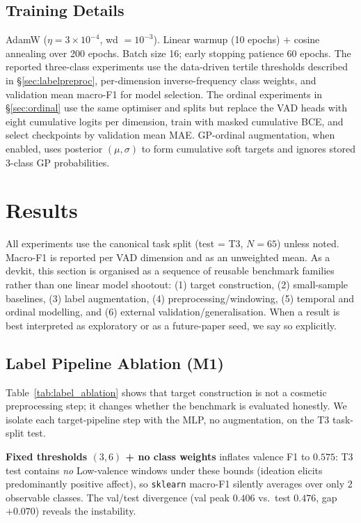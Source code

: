 \documentclass[sigconf,nonacm]{acmart}
\begin{document}
\subsection{Training Details}
AdamW ($\eta = 3{\times}10^{-4}$, wd $= 10^{-3}$).
Linear warmup (10 epochs) $+$ cosine annealing over 200 epochs.
Batch size 16; early stopping patience 60 epochs.
The reported three-class experiments use the data-driven tertile thresholds
described in \S\ref{sec:labelpreproc}, per-dimension inverse-frequency class
weights, and validation mean macro-F1 for model selection.
The ordinal experiments in \S\ref{sec:ordinal} use the same optimiser and
splits but replace the VAD heads with eight cumulative logits per dimension,
train with masked cumulative BCE, and select checkpoints by validation mean
MAE.  GP-ordinal augmentation, when enabled, uses posterior $(\mu,\sigma)$ to
form cumulative soft targets and ignores stored 3-class GP probabilities.

\section{Results}
\label{sec:results}

All experiments use the canonical task split (test = T3, $N = 65$) unless
noted. Macro-F1 is reported per VAD dimension and as an unweighted mean.
As a devkit, this section is organised as a sequence of reusable benchmark
families rather than one linear model shootout:
(1) target construction,
(2) small-sample baselines,
(3) label augmentation,
(4) preprocessing/windowing,
(5) temporal and ordinal modelling,
and (6) external validation/generalisation.
When a result is best interpreted as exploratory or as a future-paper seed,
we say so explicitly.

\subsection{Label Pipeline Ablation (M1)}
\label{sec:labelablation}

Table~\ref{tab:label_ablation} shows that target construction is not a cosmetic preprocessing
step; it changes whether the benchmark is evaluated honestly.
We isolate each target-pipeline step with the MLP, no augmentation, on the T3
task-split test.

\textbf{Fixed thresholds $(3, 6)$ + no class weights} inflates valence F1
to $0.575$: T3 test contains \emph{no} Low-valence windows under these
bounds (ideation elicits predominantly positive affect), so \texttt{sklearn}
macro-F1 silently averages over only 2 observable classes.
The val/test divergence (val peak $0.406$ vs.\ test $0.476$, gap $+0.070$)
reveals the instability.
\end{document}
